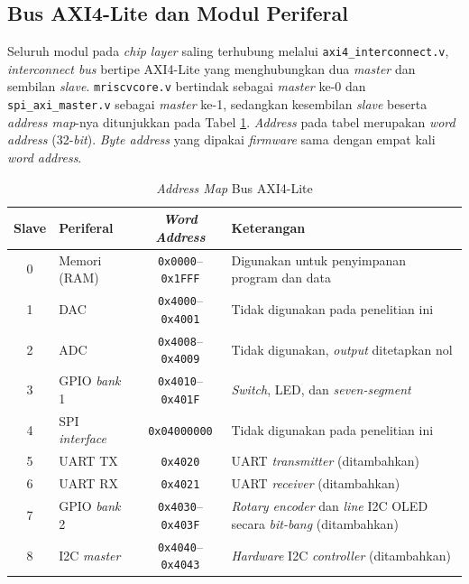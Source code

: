 \subsection{Bus AXI4-Lite dan Modul Periferal}
\label{subsec:bus-axi4-periferal}

Seluruh modul pada \textit{chip layer} saling terhubung melalui \texttt{axi4\_interconnect.v}, \textit{interconnect bus} bertipe AXI4-Lite yang menghubungkan dua \textit{master} dan sembilan \textit{slave}. \texttt{mriscvcore.v} bertindak sebagai \textit{master} ke-0 dan \texttt{spi\_axi\_master.v} sebagai \textit{master} ke-1, sedangkan kesembilan \textit{slave} beserta \textit{address map}-nya ditunjukkan pada Tabel \ref{Tab: Peta Alamat AXI}. \textit{Address} pada tabel merupakan \textit{word address} (32-\textit{bit}). \textit{Byte address} yang dipakai \textit{firmware} sama dengan empat kali \textit{word address}.

\begin{table}[h]
	\centering
	\begin{tabular}{|c|l|c|p{5.5cm}|}
		\hline
		\textbf{Slave} & \textbf{Periferal} & \textbf{\textit{Word Address}} & \textbf{Keterangan} \\
		\hline
		0 & Memori (RAM) & \texttt{0x0000}--\texttt{0x1FFF} & Digunakan untuk penyimpanan program dan data \\ \hline
		1 & DAC & \texttt{0x4000}--\texttt{0x4001} & Tidak digunakan pada penelitian ini \\ \hline
		2 & ADC & \texttt{0x4008}--\texttt{0x4009} & Tidak digunakan, \textit{output} ditetapkan nol \\ \hline
		3 & GPIO \textit{bank} 1 & \texttt{0x4010}--\texttt{0x401F} & \textit{Switch}, LED, dan \textit{seven-segment} \\ \hline
		4 & SPI \textit{interface} & \texttt{0x04000000} & Tidak digunakan pada penelitian ini \\ \hline
		5 & UART TX & \texttt{0x4020} & UART \textit{transmitter} (ditambahkan) \\ \hline
		6 & UART RX & \texttt{0x4021} & UART \textit{receiver} (ditambahkan) \\ \hline
		7 & GPIO \textit{bank} 2 & \texttt{0x4030}--\texttt{0x403F} & \textit{Rotary encoder} dan \textit{line} I2C OLED secara \textit{bit-bang} (ditambahkan) \\ \hline
		8 & I2C \textit{master} & \texttt{0x4040}--\texttt{0x4043} & \textit{Hardware} I2C \textit{controller} (ditambahkan) \\ \hline
	\end{tabular}
	\vspace{0.5em}
	\caption{\textit{Address Map} Bus AXI4-Lite}
	\label{Tab: Peta Alamat AXI}
\end{table}

